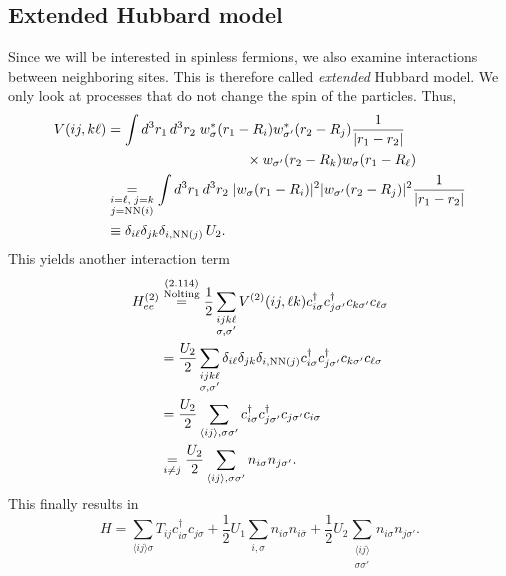\documentclass[../../main.tex]{subfiles}
\begin{document}
\subsection*{Extended Hubbard model}
Since we will be interested in spinless fermions, we also examine interactions between neighboring sites. This is therefore called \emph{extended} Hubbard model. We only look at processes that do not change the spin of the particles. Thus,
\begin{align}
V(ij,k \ell)&=
\int d^3r_1\,d^3r_2\;
w_\sigma^*(r_1-R_i)w_{\sigma'}^*(r_2-R_j)
\frac{1}{|r_1-r_2|}
\notag\\
&\hspace{35mm}\times
w_{\sigma'}(r_2-R_k) w_\sigma(r_1-R_\ell)
\notag\\
&\underset{\substack{i=\ell,\;j=k\\j=\mathrm{NN}(i)}}{=}
\int d^3r_1\,d^3r_2\;
|w_\sigma(r_1-R_i)|^2|w_{\sigma'}(r_2-R_j)|^2
\frac{1}{|r_1-r_2|}
\notag\\
&\equiv\delta_{i\ell}\delta_{jk}\delta_{i,\mathrm{NN}(j)}\,U_2.
\label{eq:passetti2022-nn-matrix}
\end{align}
This yields another interaction term
\begin{align}
H_{ee}^{(2)}
&\overset{\substack{(2.114)\\\text{Nolting}}}{=}
\frac12\sum_{\substack{ijk\ell\\\sigma,\sigma'}}
V^{(2)}(ij,\ell k)
c_{i\sigma}^\dagger c_{j\sigma'}^\dagger
c_{k\sigma'}c_{\ell\sigma}
\notag\\
&=\frac{U_2}{2}\sum_{\substack{ijk\ell\\\sigma,\sigma'}}
\delta_{i\ell}\delta_{jk}\delta_{i,\mathrm{NN}(j)}
c_{i\sigma}^\dagger c_{j\sigma'}^\dagger
c_{k\sigma'}c_{\ell\sigma}
\notag\\
&=\frac{U_2}{2}\sum_{\langle ij\rangle,\sigma\sigma'}
c_{i\sigma}^\dagger c_{j\sigma'}^\dagger
c_{j\sigma'}c_{i\sigma}
\notag\\
&\underset{i\ne j}{=}\frac{U_2}{2}
\sum_{\langle ij\rangle,\sigma\sigma'}n_{i\sigma}n_{j\sigma'}.
\label{eq:passetti2022-nearest-neighbour}
\end{align}
This finally results in
\begin{equation}
H=
\sum_{\langle ij\rangle\sigma}T_{ij}c_{i\sigma}^\dagger c_{j\sigma}
+\frac12 U_1\sum_{i,\sigma}n_{i\sigma}n_{i\bar\sigma} 
+\frac12 U_2\sum_{\substack{\langle ij\rangle\\\sigma\sigma'}}
n_{i\sigma}n_{j\sigma'}.
\end{equation}
\end{document}
